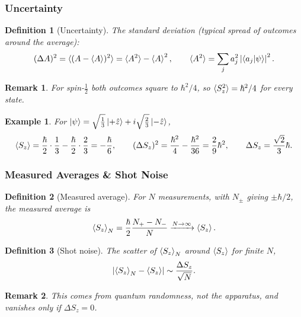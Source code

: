 \documentclass{article}
\newtheorem{definition}{Definition}
\newtheorem*{example}{Example}
\newtheorem{remark}{Remark}
\begin{document}
\subsubsection{Uncertainty}
\begin{definition}[Uncertainty]
    The standard deviation (typical spread of outcomes around the average):
    \begin{equation}
        (\Delta A)^2 = \braket{(A - \braket{A})^2} = \braket{A^2} - \braket{A}^2, \qquad \braket{A^2} = \sum_j a_j^2\left|\braket{a_j|\psi}\right|^2.
    \end{equation}
\end{definition}
\begin{remark}
    For spin-$\tfrac12$ both outcomes square to $\hbar^2/4$, so $\braket{S_z^2} = \hbar^2/4$ for every state.
\end{remark}
\begin{example}
    For $\ket{\psi} = \sqrt{\tfrac{1}{3}}\ket{+\hat{z}} + i\sqrt{\tfrac{2}{3}}\ket{-\hat{z}}$,
    \[\braket{S_z} = \frac{\hbar}{2}\cdot\frac{1}{3} - \frac{\hbar}{2}\cdot\frac{2}{3} = -\frac{\hbar}{6}, \qquad (\Delta S_z)^2 = \frac{\hbar^2}{4} - \frac{\hbar^2}{36} = \frac{2}{9}\hbar^2, \qquad \Delta S_z = \frac{\sqrt{2}}{3}\hbar.\]
\end{example}

\subsubsection{Measured Averages \& Shot Noise}
\begin{definition}[Measured average]
    For $N$ measurements, with $N_\pm$ giving $\pm\hbar/2$, the measured average is
    \begin{equation}
        \braket{S_z}_N = \frac{\hbar}{2}\frac{N_+ - N_-}{N} \xrightarrow{N\to\infty} \braket{S_z}.
    \end{equation}
\end{definition}
\begin{definition}[Shot noise]
    The scatter of $\braket{S_z}_N$ around $\braket{S_z}$ for finite $N$,
    \begin{equation}
        \left|\braket{S_z}_N - \braket{S_z}\right| \sim \frac{\Delta S_z}{\sqrt{N}}.
    \end{equation}
\end{definition}
\begin{remark}
    This comes from quantum randomness, not the apparatus, and vanishes only if $\Delta S_z = 0$.
\end{remark}
\end{document}
